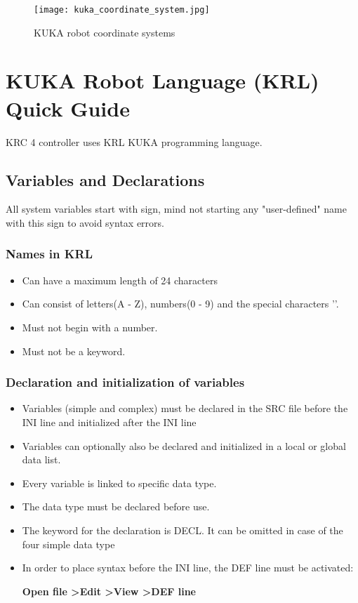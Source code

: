 \documentclass[a4paper]{report}
\begin{document}
\begin{figure}[h]
	\caption{KUKA robot coordinate systems}
	\centering
\texttt{[image: kuka\_coordinate\_system.jpg]}
\end{figure} 
\newpage
\section{KUKA Robot Language (KRL) Quick Guide}
KRC 4 controller uses KRL KUKA programming language.
\subsection{Variables and Declarations}
All system variables start with \textdollar sign, mind not starting any "user-defined" name with this sign to avoid syntax errors.
\vspace{0.5cm}
\subsubsection{Names in KRL}
\begin{itemize}
	\item Can have a maximum length of 24 characters
	\item Can consist of letters(A - Z), numbers(0 - 9) and the special characters '\textdollar'.
	\item Must not begin with a number.
	\item Must not be a keyword.
\end{itemize}
\subsubsection{Declaration and initialization of variables}
\begin{itemize}
	\item Variables (simple and complex) must be declared in the SRC file before the INI line and initialized after the INI line
	\item Variables can optionally also be declared and initialized in a local or global data list. 
	\item Every variable is linked to specific data type.
	\item The data type must be declared before use.
	\item The keyword for the declaration is DECL. It can be omitted in case of the four simple data type	
	\item In order to place syntax before the INI line, the DEF line must be activated:
	
	\centering	\textbf{  Open file \textgreater Edit \textgreater View \textgreater DEF line}
\end{itemize}
\end{document}
